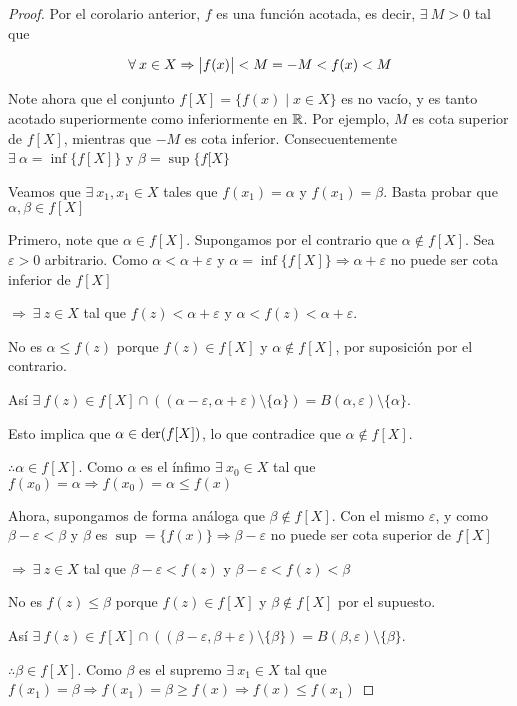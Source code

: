 \begin{proof}
    Por el corolario anterior, $f$ es una función acotada, es decir, $\exists \: M > 0$ tal que

    $$\forall \: x \in X \Rightarrow \abs{f(x)} < M = - M < f(x) < M$$

    Note ahora que el conjunto $f[X] = \{ f(x) \mid x \in X \}$ es no vacío, y es tanto acotado superiormente como inferiormente en $\mathbb{R}$. Por ejemplo, $M$ es cota superior de $f[X]$, mientras que $-M$ es cota inferior. Consecuentemente $\exists \: \alpha = \inf \{ f[X] \}$ y $\beta = \sup \{ f[X \}$

    Veamos que $\exists \: x_1, x_1 \in X$ tales que $f(x_1) = \alpha$ y $f(x_1) = \beta$. Basta probar que $\alpha, \beta \in f[X]$

    Primero, note que $\alpha \in f[X]$. Supongamos por el contrario que $\alpha \notin f[X]$. Sea $\varepsilon > 0$ arbitrario. Como $\alpha < \alpha + \varepsilon$ y $\alpha = \inf \{ f[X]\} \Rightarrow \alpha + \varepsilon$ no puede ser cota inferior de $f[X]$

    $\Rightarrow \: \exists \: z \in X$ tal que $f(z) < \alpha + \varepsilon$ y $\alpha < f(z) < \alpha + \varepsilon$. 
    
    No es $\alpha \leqslant f(z)$ porque $f(z) \in f[X]$ y $\alpha \notin f[X]$, por suposición por el contrario.
    
    Así $\exists \: f(z) \in f[X] \cap ((\alpha - \varepsilon, \alpha + \varepsilon) \setminus \{ \alpha \}) = B(\alpha, \varepsilon) \setminus \{ \alpha \}$. 
    
    Esto implica que $\alpha \in \mathrm{der}(f[X])$, lo que contradice que $\alpha \notin f[X]$.

    $\therefore \alpha \in f[X]$. Como $\alpha$ es el ínfimo $\exists \: x_0 \in X$ tal que $f(x_0) = \alpha \Rightarrow f(x_0) = \alpha \leqslant f(x)$

    Ahora, supongamos de forma análoga que $\beta \notin f[X]$. Con el mismo $\varepsilon$, y como $\beta - \varepsilon < \beta$ y $\beta$ es $\sup = \{f(x) \} \Rightarrow \beta - \varepsilon$ no puede ser cota superior de $f[X]$

    $\Rightarrow \: \exists \: z \in X$ tal que $\beta - \varepsilon < f(z)$ y $\beta - \varepsilon < f(z) < \beta$

    No es $f(z) \leqslant \beta$ porque $f(z) \in f[X]$ y $\beta \notin f[X]$ por el supuesto.

    Así $\exists \: f(z) \in f[X] \cap ((\beta - \varepsilon, \beta + \varepsilon) \setminus \{ \beta \}) = B(\beta, \varepsilon) \setminus \{ \beta \}$.

    $\therefore \beta \in f[X]$. Como $\beta$ es el supremo $\exists \: x_1 \in X$ tal que $f(x_1) = \beta \Rightarrow f(x_1) = \beta \geqslant f(x) \Rightarrow f(x) \leqslant f(x_1)$
\end{proof}


